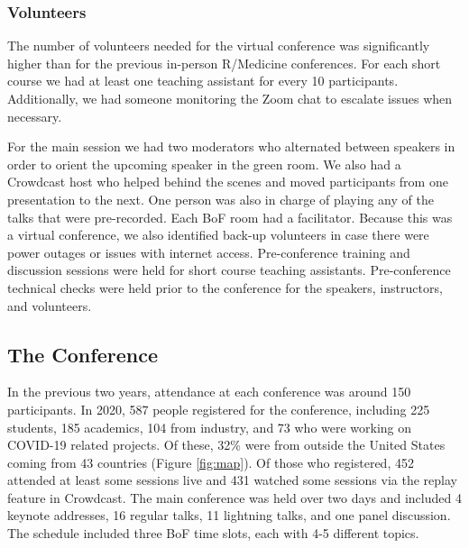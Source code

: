 \hypertarget{volunteers}{%
\subsubsection{Volunteers}\label{volunteers}}

The number of volunteers needed for the virtual conference was significantly higher than for the previous in-person R/Medicine conferences. For each short course we had at least one teaching assistant for every 10 participants. Additionally, we had someone monitoring the Zoom chat to escalate issues when necessary.

For the main session we had two moderators who alternated between speakers in order to orient the upcoming speaker in the green room. We also had a Crowdcast host who helped behind the scenes and moved participants from one presentation to the next. One person was also in charge of playing any of the talks that were pre-recorded. Each BoF room had a facilitator. Because this was a virtual conference, we also identified back-up volunteers in case there were power outages or issues with internet access. Pre-conference training and discussion sessions were held for short course teaching assistants. Pre-conference technical checks were held prior to the conference for the speakers, instructors, and volunteers.

\hypertarget{the-conference}{%
\subsection{The Conference}\label{the-conference}}

In the previous two years, attendance at each conference was around 150 participants. In 2020, 587 people registered for the conference, including 225 students, 185 academics, 104 from industry, and 73 who were working on COVID-19 related projects. Of these, 32\% were from outside the United States coming from 43 countries (Figure \ref{fig:map}). Of those who registered, 452 attended at least some sessions live and 431 watched some sessions via the replay feature in Crowdcast. The main conference was held over two days and included 4 keynote addresses, 16 regular talks, 11 lightning talks, and one panel discussion. The schedule included three BoF time slots, each with 4-5 different topics.

